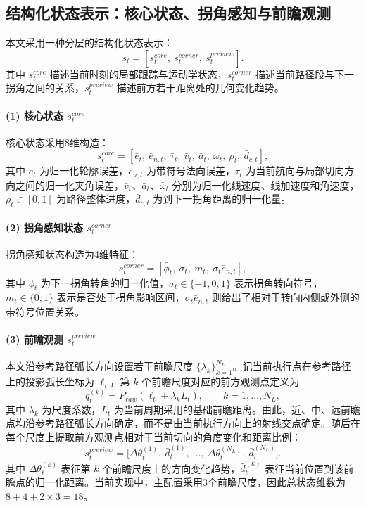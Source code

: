 \documentclass[preprint,12pt]{elsarticle}
\begin{document}
\subsection{结构化状态表示：核心状态、拐角感知与前瞻观测}
本文采用一种分层的结构化状态表示：
\begin{equation}
s_t=[s_t^{core},\ s_t^{corner},\ s_t^{preview}].
\end{equation}
其中 $s_t^{core}$ 描述当前时刻的局部跟踪与运动学状态，$s_t^{corner}$ 描述当前路径段与下一拐角之间的关系，$s_t^{preview}$ 描述前方若干距离处的几何变化趋势。

\paragraph{(1) 核心状态 $s_t^{core}$} 核心状态采用8维构造：
\begin{equation}
s_t^{core}=[\bar e_t,\ \bar e_{n,t},\ \bar\tau_t,\ \bar v_t,\ \bar a_t,\ \bar\omega_t,\ \rho_t,\ \bar d_{c,t}],
\end{equation}
其中 $\bar e_t$ 为归一化轮廓误差，$\bar e_{n,t}$ 为带符号法向误差，$\bar\tau_t$ 为当前航向与局部切向方向之间的归一化夹角误差，$\bar v_t$、$\bar a_t$、$\bar\omega_t$ 分别为归一化线速度、线加速度和角速度，$\rho_t\in[0,1]$ 为路径整体进度，$\bar d_{c,t}$ 为到下一拐角距离的归一化量。

\paragraph{(2) 拐角感知状态 $s_t^{corner}$} 拐角感知状态构造为4维特征：
\begin{equation}
s_t^{corner}=[\bar\phi_t,\ \sigma_t,\ m_t,\ \sigma_t\bar e_{n,t}],
\end{equation}
其中 $\bar\phi_t$ 为下一拐角转角的归一化值，$\sigma_t\in\{-1,0,1\}$ 表示拐角转向符号，$m_t\in\{0,1\}$ 表示是否处于拐角影响区间，$\sigma_t\bar e_{n,t}$ 则给出了相对于转向内侧或外侧的带符号位置关系。

\paragraph{(3) 前瞻观测 $s_t^{preview}$} 本文沿参考路径弧长方向设置若干前瞻尺度 $\{\lambda_k\}_{k=1}^{N_L}$。记当前执行点在参考路径上的投影弧长坐标为 $\ell_t$，第 $k$ 个前瞻尺度对应的前方观测点定义为
\begin{equation}
q_t^{(k)}=P_{raw}(\ell_t+\lambda_k L_t),\qquad k=1,\dots,N_L,
\end{equation}
其中 $\lambda_k$ 为尺度系数，$L_t$ 为当前周期采用的基础前瞻距离。由此，近、中、远前瞻点均沿参考路径弧长方向确定，而不是由当前执行方向上的射线交点确定。随后在每个尺度上提取前方观测点相对于当前切向的角度变化和距离比例：
\begin{equation}
s_t^{preview}=\big[\Delta \theta_t^{(1)},\ \bar d_t^{(1)},\ \dots,\ \Delta \theta_t^{(N_L)},\ \bar d_t^{(N_L)}\big].
\end{equation}
其中 $\Delta \theta_t^{(k)}$ 表征第 $k$ 个前瞻尺度上的方向变化趋势，$\bar d_t^{(k)}$ 表征当前位置到该前瞻点的归一化距离。当前实现中，主配置采用3个前瞻尺度，因此总状态维数为 $8+4+2\times 3=18$。
\end{document}
